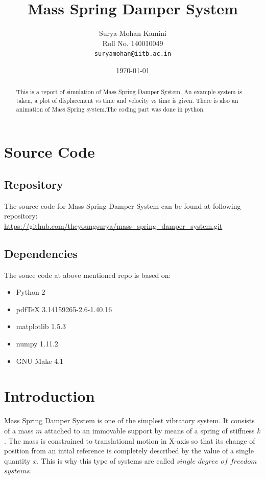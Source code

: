 \documentclass[12pt, a4paper]{article}
\begin{document}
\title{Mass Spring Damper System}
\author{Surya Mohan Kamini\\
	Roll No. 140010049\\
	\texttt{suryamohan@iitb.ac.in}
	}
\date{\today}
\maketitle

{\tableofcontents}
{\listoffigures}

\pagebreak

\begin{abstract}
This is a report of simulation of Mass Spring Damper System. An example system is taken, a plot of displacement vs time and  velocity vs time is given.
There is also an animation of Mass Spring system.The coding part was done in python.
\end{abstract}

\section{Source Code}
\subsection{Repository}
The source code for Mass Spring Damper System  can be found at following repository:\\
\url{https://github.com/theyoungsurya/mass_spring_damper_system.git}

\subsection{Dependencies}
The souce code at above mentioned repo is based on:
\begin{itemize}
\item Python 2
\item pdfTeX 3.14159265-2.6-1.40.16
\item matplotlib 1.5.3
\item numpy 1.11.2
\item GNU Make 4.1
\end{itemize}



\section{Introduction}
    Mass Spring Damper System is one of the simplest vibratory system. It consists of a mass $m$ attached to an immovable support by means of a spring of stiffness $k$. The mass is constrained to translational motion in X-axis so that its change of position from an intial reference is completely described by the value of a single quantity $x$. This is why this type of systems are called $single$ $degree$ $of$ $freedom$ $systems$.\\ 
\end{document}
